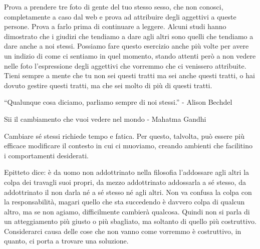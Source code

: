 \documentclass[12pt]{book} %
\begin{document}
Prova a prendere tre foto di gente del tuo stesso sesso, che non conosci, completamente a caso dal web e prova ad attribuire degli aggettivi a queste persone. 
Prova a farlo prima di continuare a leggere.
Alcuni studi hanno dimostrato che i giudizi che tendiamo a dare agli altri sono quelli che tendiamo a dare anche a noi stessi. Possiamo fare questo esercizio anche più volte per avere un indizio di come ci sentiamo in quel momento, stando attenti però a non vedere nelle foto l'espressione degli aggettivi che vorremmo che ci venissero attribuite. Tieni sempre a mente che tu non sei questi tratti ma sei anche questi tratti, o hai dovuto gestire questi tratti, ma che sei molto di più di questi tratti.

“Qualunque cosa diciamo, parliamo sempre di noi stessi.” - Alison Bechdel

Sii il cambiamento che vuoi vedere nel mondo - Mahatma Gandhi

Cambiare sé stessi richiede tempo e fatica. Per questo, talvolta, può essere più efficace modificare il contesto in cui ci muoviamo, creando ambienti che facilitino i comportamenti desiderati.

Epitteto dice: è da uomo non addottrinato nella filosofia l'addossare agli altri la colpa dei
travagli suoi propri, da mezzo addottrinato addossarla a sé stesso, da addottrinato il non darla né a sé stesso né agli
altri. Non va confusa la colpa con la responsabilità, magari quello che sta succedendo è davvero colpa di qualcun altro, ma se non agiamo, difficilmente cambierà qualcosa. Quindi non si parla di un atteggiamento più giusto o più sbagliato, ma soltanto di quello più
costruttivo. Considerarci causa delle cose che non vanno come vorremmo è costruttivo, in quanto, ci porta a trovare una soluzione. 
\end{document}
